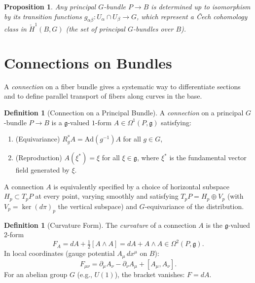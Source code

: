 \documentclass[12pt,a4paper]{amsart}
\newtheorem{proposition}[theorem]{Proposition}
\theoremstyle{definition}
\newtheorem{definition}[theorem]{Definition}
\begin{document}
\begin{proposition}
Any principal $G$-bundle $P \to B$ is determined up to isomorphism by its
transition functions $g_{\alpha\beta} \colon U_\alpha \cap U_\beta \to G$,
which represent a \v{C}ech cohomology class in
$\check{H}^1(B, G)$ (the set of principal $G$-bundles over $B$).
\end{proposition}

\section{Connections on Bundles}
\label{sec:connections}

A \emph{connection} on a fiber bundle gives a systematic way to differentiate
sections and to define parallel transport of fibers along curves in the base.

\begin{definition}[Connection on a Principal Bundle]
A \emph{connection} on a principal $G$-bundle $P \to B$ is a
$\mathfrak{g}$-valued $1$-form $A \in \Omega^1(P, \mathfrak{g})$ satisfying:
\begin{enumerate}[noitemsep]
  \item (Equivariance)\; $R_g^* A = \mathrm{Ad}(g^{-1}) A$ for all $g \in G$,
  \item (Reproduction)\; $A(\xi^*) = \xi$ for all $\xi \in \mathfrak{g}$,
        where $\xi^*$ is the fundamental vector field generated by $\xi$.
\end{enumerate}
\end{definition}

A connection $A$ is equivalently specified by a choice of horizontal subspace
$H_p \subset T_p P$ at every point, varying smoothly and satisfying
$T_pP = H_p \oplus V_p$ (with $V_p = \ker(d\pi)_p$ the vertical subspace) and
$G$-equivariance of the distribution.

\begin{definition}[Curvature Form]
The \emph{curvature} of a connection $A$ is the $\mathfrak{g}$-valued $2$-form
\[
  F_A = dA + \tfrac{1}{2}[A \wedge A] = dA + A \wedge A \in \Omega^2(P, \mathfrak{g}).
\]
In local coordinates (gauge potential $A_\mu \, dx^\mu$ on $B$):
\[
  F_{\mu\nu} = \partial_\mu A_\nu - \partial_\nu A_\mu + [A_\mu, A_\nu].
\]
For an abelian group $G$ (e.g., $U(1)$), the bracket vanishes: $F = dA$.
\end{definition}
\end{document}
